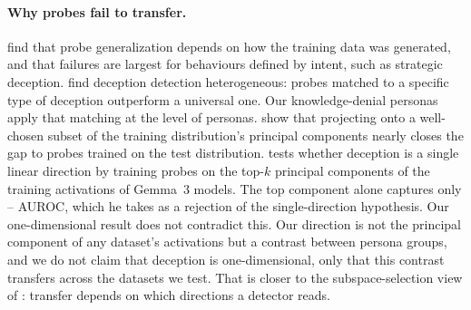 \paragraph{Why probes fail to transfer.} \citet{kirch2025offpolicy} find that probe generalization
depends on how the training data was generated, and that failures are largest for behaviours
defined by intent, such as strategic deception. \citet{natarajan2026targeted} find deception detection
heterogeneous: probes matched to a specific type of deception outperform a universal one. Our
knowledge-denial personas apply that matching at the level of personas. \citet{yoo2026subspace} show that projecting
onto a well-chosen subset of the training distribution's principal components nearly closes the gap
to probes trained on the test distribution. \citet{kumar2026pressure} tests whether deception is a
single linear direction by training probes on the top-$k$ principal components of the training
activations of Gemma~3 models. The top component alone captures only -- AUROC, which he
takes as a rejection of the single-direction hypothesis. Our one-dimensional result does not
contradict this. Our direction is not the principal component of any dataset's activations but a
contrast between persona groups, and we do not claim that deception is one-dimensional, only that
this contrast transfers across the datasets we test. That is closer to the subspace-selection view
of \citet{yoo2026subspace}: transfer depends on which directions a detector reads.
